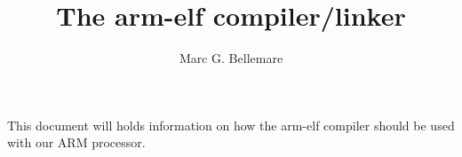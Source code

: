 \documentclass[12pt]{article}
\title{The arm-elf compiler/linker}
\author{Marc G. Bellemare}
\begin{document}
\maketitle

This document will holds information on how the arm-elf compiler should
be used with our ARM processor.
\end{document}

